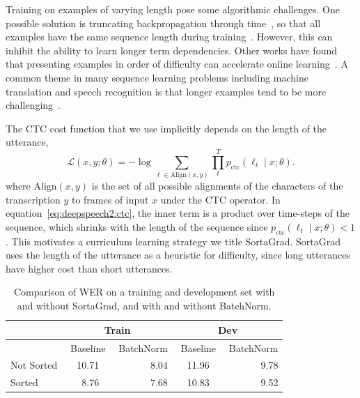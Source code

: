 Training on examples of varying length pose some algorithmic challenges. One
possible solution is truncating backpropagation through
time~\cite{williams1990}, so that all examples have the same sequence length
during training~\cite{sainath2015}. However, this can inhibit the ability to
learn longer term dependencies. Other works have found that presenting examples
in order of difficulty can accelerate online
learning~\cite{bengio2009curriculum, zaremba2014}. A common theme in many
sequence learning problems including machine translation and speech recognition
is that longer examples tend to be more challenging~\cite{cho2014}.

The CTC cost function that we use implicitly depends on the length of the
utterance,
\begin{equation}
\label{eq:deepspeech2:ctc}
    \mathcal{L}(x, y; \theta) = -\log \sum_{\ell \in \textrm{Align}(x, y)}
        \prod_t^{T} p_{\textrm{ctc}}(\ell_t \mid x; \theta).
\end{equation}
where $\textrm{Align}(x, y)$ is the set of all possible alignments of the
characters of the transcription $y$ to frames of input $x$ under the CTC
operator. In equation~\ref{eq:deepspeech2:ctc}, the inner term is a product
over time-steps of the sequence, which shrinks with the length of the sequence
since $p_{\textrm{ctc}}(\ell_t \mid x;\theta)<1$. This motivates a curriculum
learning strategy we title SortaGrad. SortaGrad uses the length of the
utterance as a heuristic for difficulty, since long utterances have higher cost
than short utterances.

\begin{table}
\centering
\begin{tabular}{l  r r r  r  r r r  r}
\toprule
& \multicolumn{4}{c}{Train} & \multicolumn{4}{c}{Dev}\\
\midrule
& \multicolumn{3}{c}{Baseline} &  BatchNorm & \multicolumn{3}{c}{Baseline} & BatchNorm\\
\midrule
Not Sorted & & 10.71 & & 8.04 & & 11.96 & & 9.78 \\
Sorted     & & 8.76 & & 7.68 & & 10.83 & & 9.52 \\
\bottomrule
\end{tabular}
\caption{Comparison of WER on a training and development set with and without
         SortaGrad, and with and without BatchNorm.}
\label{table:deepspeech2:sorting}
\end{table}

